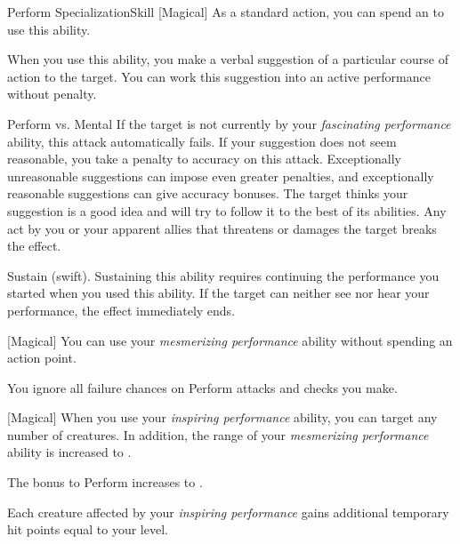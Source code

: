 \begin{feat}{Perform Specialization}{Skill}
        [Magical] As a standard action, you can spend an  to use this ability.
        \begin{ability}
            \begin{spelltargetinginfo}
            \end{spelltargetinginfo}
            \begin{spelleffects}
                \spellspecial When you use this ability, you make a verbal suggestion of a particular course of action to the target.
                You can work this suggestion into an active performance without penalty.
                \begin{spellattack}{Perform vs. Mental}
                    \spellspecial If the target is not currently \fascinated by your \textit{fascinating performance} ability, this attack automatically fails.
                    If your suggestion does not seem reasonable, you take a  penalty to accuracy on this attack.
                    Exceptionally unreasonable suggestions can impose even greater penalties, and exceptionally reasonable suggestions can give accuracy bonuses.
                    \spellsuccess The target thinks your suggestion is a good idea and will try to follow it to the best of its abilities.
                    Any act by you or your apparent allies that threatens or damages the target breaks the effect.
                \end{spellattack}
                \spelldur Sustain (swift). Sustaining this ability requires continuing the performance you started when you used this ability. If the target can neither see nor hear your performance, the effect immediately ends.
            \end{spelleffects}
        \end{ability}

        [Magical] You can use your \textit{mesmerizing performance} ability without spending an action point.

         You ignore all failure chances on Perform attacks and checks you make.

        [Magical] When you use your \textit{inspiring performance} ability, you can target any number of creatures.
        In addition, the range of your \textit{mesmerizing performance} ability is increased to \rnglong.

         The bonus to Perform increases to .


         Each creature affected by your \textit{inspiring performance} gains additional temporary hit points equal to your level.
    \end{feat}

